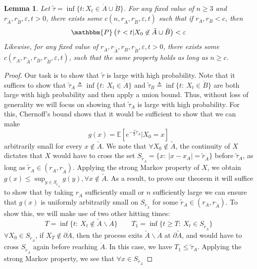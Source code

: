 \documentclass[12pt, nofootinbib,english, amsmath, amssymb, aps, priprint, graphicx,floatfix]{revtex4-1}
\newtheorem{lemma}{Lemma}
\theoremstyle{plain}
\theoremstyle{definition}
\theoremstyle{plain}
\begin{document}
\begin{lemma}
\label{lem:longtime}Let $\tilde{\tau}= \inf \{ t : X_t \in \dot A \cup \dot B\}$. For any fixed value of $n
\geqslant 3$ and $r_{\tilde{A}}, r_{\tilde{B}}, \varepsilon,t > 0$, there
exists some $c (n, r_{\tilde{A}}, r_{\tilde{B}}, \varepsilon,t)$ such that if
$r_{\dot A}, r_{\dot B} < c$, then
\[ \mathbbm{P} \left( \tilde{\tau} < t |X_0 \not\in\tilde{A} \cup \tilde{B} \right) < \varepsilon \]
Likewise, for any fixed value of $r_{\dot A}, r_{\tilde{A}}, r_{\dot B}, r_{\tilde{B}},
\varepsilon,t > 0$, there exists some $c (r_{\dot A}, r_{\tilde{A}}, r_{\dot B},
r_{\tilde{B}}, \varepsilon,t)$, such that the same property holds as long as $n \geqslant c$.
\end{lemma}\begin{proof}
Our task is to show that $\tilde \tau$ is large with high probability.  Note that it suffices to show that $\tilde \tau_A \triangleq \inf\{t:\ X_t\in \dot A\}$ and $\tilde \tau_B \triangleq \inf\{t:\ X_t\in \dot B\}$ are both large with high probability and then apply a union bound.  Thus, without loss of generality we will focus on showing that $\tilde \tau_A$ is large with high probability.  For this, Chernoff's bound shows that it would be sufficient to show that we can make
\[
g(x)=\mathbb{E}[e^{-\frac{1}{2}\tilde \tau_A}|X_0=x]
\] 
arbitrarily small for every $x\notin \tilde A$. We note that $\forall X_0 \notin \tilde A$, the continuity of $X$ dictates that $X$ would have to cross the set $S_{\tilde r_{\dot A}}=\{x:\ |x-x_A| = \tilde r_{\dot A}\}$ before $\tilde \tau_A$, as long as $\tilde r_{\dot A} \in (r_{\dot A},r_{\tilde A})$.  Applying the strong Markov property of $X$, we obtain $g(x)\leq \sup_{y\in S_{\tilde r_{\dot A}}}g(y), \forall x \notin \tilde A$. As a result, to prove our theorem it will suffice to show that by taking $r_{\dot A}$ sufficiently small or $n$ sufficiently large we can ensure that $g(x)$ is uniformly arbitrarily small on $S_{\tilde r_{\dot A}}$ for some $\tilde r_{\dot A} \in (r_{\dot A},r_{\tilde A})$.  To show this, we will make use of two other hitting times:
\[
T =\inf \{t:\ X_t \notin \tilde A \backslash \dot A\} 
\qquad
T_1 =\inf \{t\geq T:\ X_t \in S_{\tilde r_{\dot A}}\} 
\]
$\forall X_0 \in S_{\tilde r_{\dot A}}$, if $X_T\notin \partial\dot A$, then the process exits $\tilde A \backslash \dot A$ at $\partial \tilde A$, and would have to cross $S_{\tilde r_{\dot A}}$ again before reaching $\dot A$. In this case, we have $T_1 \leq \tilde \tau_A$.  Applying the strong Markov property, we see that $\forall x\in S_{\tilde r_{\dot A}}$

\end{proof}
\end{document}
